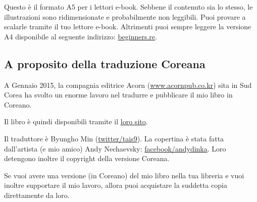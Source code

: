 



\ifdefined\ebook
Questo è il formato A5 per i lettori e-book.
Sebbene il contenuto sia lo stesso, le illustrazioni sono ridimensionate e probabilmente non leggibili.
Puoi provare a scalarle tramite il tuo lettore e-book. Altrimenti puoi sempre leggere la versione A4
disponibile al seguente indirizzo:
\href{http://go.yurichev.com/17009}{beginners.re}.
\fi

\subsection*{A proposito della traduzione Coreana}

A Gennaio 2015, la compagnia editrice Acorn (\href{http://www.acornpub.co.kr}{www.acornpub.co.kr}) sita in Sud Corea ha svolto un enorme lavoro nel tradurre e pubblicare il mio libro in Coreano.

Il libro è quindi disponibili tramite il \href{http://go.yurichev.com/17343}{loro sito}.

\iffalse
\begin{figure}[H]
\centering
\texttt{[image: acorn\_cover.jpg]}
\end{figure}
\fi

Il traduttore è Byungho Min (\href{http://go.yurichev.com/17344}{twitter/tais9}).
La copertina è stata fatta dall'artista (e mio amico) Andy Nechaevsky:
\href{http://go.yurichev.com/17023}{facebook/andydinka}.
Loro detengono inoltre il copyright della versione Coreana.

Se vuoi avere una versione  (in Coreano) del mio libro nella tua libreria e 
vuoi inoltre supportare il mio lavoro, allora puoi acquistare la suddetta copia direttamente da loro.
